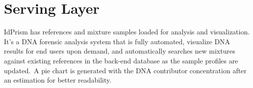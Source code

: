 \documentclass[../main.tex]{subfiles}
\begin{document}
\section{Serving Layer}

IdPrism has references and mixture samples loaded for analysis and visualization. It's a DNA forensic analysis system that is fully automated, visualize DNA results for end users upon demand, and automatically searches new mixtures against existing references in the back-end database as the sample profiles are updated.\  
A pie chart is generated with the DNA contributor concentration after an estimation for better readability.
\end{document}
